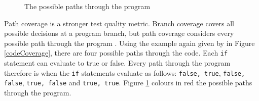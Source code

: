 \begin{figure}
    \caption{The possible paths through the program}%
    \label{programPaths}%
\end{figure}

Path coverage is a stronger test quality metric. Branch coverage covers all possible decisions at a program branch, but path coverage considers every possible path through the program \citep{Myers:2004:AST:983238, softwareTestingIntro}. Using the example again given by \citet{Myers:2004:AST:983238} in Figure \ref{codeCoverage}, there are four possible paths through the code. Each \verb+if+ statement can evaluate to true or false. Every path through the program therefore is when the \verb+if+ statements evaluate as follows: \verb+false, true+, \verb+false, false+, \verb+true, false+ and \verb+true, true+. Figure \ref{programPaths} colours in red the possible paths through the program.

